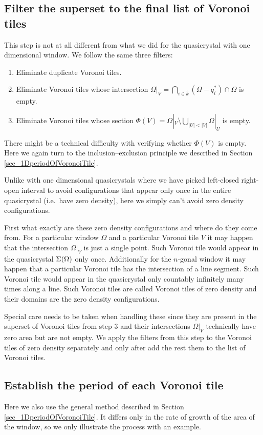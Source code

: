 \documentclass[text.tex]{subfiles}
\begin{document}
\subsection{Filter the superset to the final list of Voronoi tiles}
This step is not at all different from what we did for the quasicrystal with one dimensional window. We follow the same three filters: 
\begin{enumerate}
\item Eliminate duplicate Voronoi tiles. 
\item Eliminate Voronoi tiles whose intersection $\Omega|_{V} = \bigcap\limits_{i\in\hat{k}}(\Omega-q_i^\ast)\cap\Omega$ is empty. 
\item Eliminate Voronoi tiles whose section $\Phi(V) = \Omega|_{V}\setminus\bigcup_{|U|<|V|}\Omega|_{U}$ is empty. 
\end{enumerate}

There might be a technical difficulty with verifying whether $\Phi(V)$ is empty. Here we again turn to the inclusion--exclusion principle we described in Section \ref{sec_1DperiodOfVoronoiTile}. 

Unlike with one dimensional quasicrystals where we have picked left-closed right-open interval to avoid configurations that appear only once in the entire quasicrystal (i.e.\ have zero density), here we simply can't avoid zero density configurations. 

First what exactly are these zero density configurations and where do they come from. For a particular window $\Omega$ and a particular Voronoi tile $V$ it may happen that the intersection $\Omega|_V$ is just a single point. Such Voronoi tile would appear in the quasicrystal $\Sigma(\Omega)$ only once. Additionally for the $n$-gonal window it may happen that a particular Voronoi tile has the intersection of a line segment. Such Voronoi tile would appear in the quasicrystal only countably infinitely many times along a line. Such Voronoi tiles are called Voronoi tiles of zero density and their domains are the zero density configurations. 

Special care needs to be taken when handling these since they are present in the superset of Voronoi tiles from step 3 and their intersections $\Omega|_V$ technically have zero area but are not empty. We apply the filters from this step to the Voronoi tiles of zero density separately and only after add the rest them to the list of Voronoi tiles. 

\subsection{Establish the period of each Voronoi tile}
Here we also use the general method described in Section \ref{sec_1DperiodOfVoronoiTile}. It differs only in the rate of growth of the area of the window, so we only illustrate the process with an example. 
\end{document}
